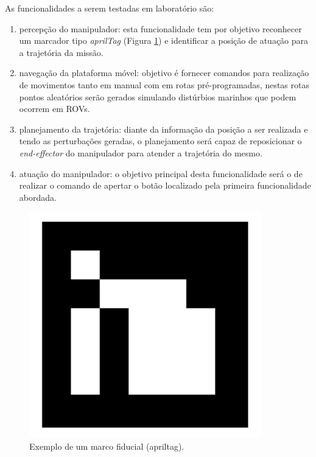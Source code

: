 As funcionalidades a serem testadas em laboratório são: 
\begin{enumerate}
	\item percepção do manipulador: esta funcionalidade tem por objetivo reconhecer um marcador tipo \textit{aprilTag} (Figura \ref{fig:apriltag}) e identificar a posição de atuação para a trajetória da missão.
	\item navegação da plataforma móvel: objetivo é fornecer comandos para realização de movimentos tanto em manual com em rotas pré-programadas, nestas rotas pontos aleatórios serão gerados simulando distúrbios marinhos que podem ocorrem em ROVs.
	\item planejamento da trajetória: diante da informação da posição a ser realizada e tendo as perturbações geradas, o planejamento será capaz de reposicionar o \textit{end-effector} do manipulador para atender a trajetória do mesmo.
	\item atuação do manipulador: o objetivo principal desta funcionalidade será o de realizar o comando de apertar o botão localizado pela primeira funcionalidade abordada.
\end{enumerate}

\begin{figure}[H] 
  \begin{center} 
  	\includegraphics[width=0.4 \textwidth]{images/apriltag.png} 
  \end{center} 
  \caption{Exemplo de um marco fiducial (apriltag).} 
  \label{fig:apriltag} 
\end{figure}



